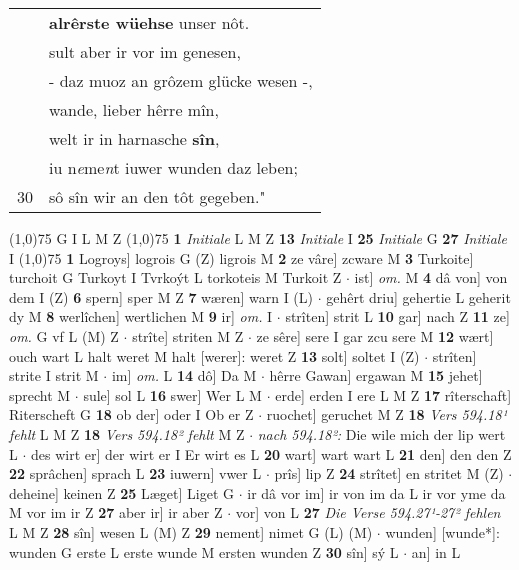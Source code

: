 \documentclass[8pt,a4paper,notitlepage]{article}
\begin{document}
\begin{table}[ht]
\begin{minipage}[t]{0.5\linewidth}
\begin{tabular}{rl}
 & \textbf{alrêrste wüehse} unser nôt.\\ 
 & sult aber ir vor im genesen,\\ 
 & - daz muoz an grôzem glücke wesen -,\\ 
 & wande, lieber hêrre mîn,\\ 
 & welt ir in harnasche \textbf{sîn},\\ 
 & iu n\textit{e}me\textit{n}t iuwer wunden daz leben;\\ 
30 & sô sîn wir an den tôt gegeben."\\ 
\end{tabular}
\scriptsize
\line(1,0){75} \newline
G I L M Z \newline
\line(1,0){75} \newline
\textbf{1} \textit{Initiale} L M Z  \textbf{13} \textit{Initiale} I  \textbf{25} \textit{Initiale} G  \textbf{27} \textit{Initiale} I  \newline
\line(1,0){75} \newline
\textbf{1} Logroys] logrois G (Z) ligrois M \textbf{2} ze vâre] zcware M \textbf{3} Turkoite] turchoit G Turkoyt I Tvrkoýt L torkoteis M Turkoit Z  $\cdot$ ist] \textit{om.} M \textbf{4} dâ von] von dem I (Z) \textbf{6} spern] sper M Z \textbf{7} wæren] warn I (L)  $\cdot$ gehêrt driu] gehertie L geherit dy M \textbf{8} werlîchen] wertlichen M \textbf{9} ir] \textit{om.} I  $\cdot$ strîten] strit L \textbf{10} gar] nach Z \textbf{11} ze] \textit{om.} G vf L (M) Z  $\cdot$ strîte] striten M Z  $\cdot$ ze sêre] sere I gar zcu sere M \textbf{12} wært] ouch wart L halt weret M halt [werer]: weret Z \textbf{13} solt] soltet I (Z)  $\cdot$ strîten] strite I strit M  $\cdot$ im] \textit{om.} L \textbf{14} dô] Da M  $\cdot$ hêrre Gawan] ergawan M \textbf{15} jehet] sprecht M  $\cdot$ sule] sol L \textbf{16} swer] Wer L M  $\cdot$ erde] erden I ere L M Z \textbf{17} rîterschaft] Riterscheft G \textbf{18} ob der] oder I Ob er Z  $\cdot$ ruochet] geruchet M Z \textbf{18} \textit{Vers 594.18¹ fehlt} L M Z  \textbf{18} \textit{Vers 594.18² fehlt} M Z   $\cdot$ \textit{nach 594.18²:} Die wile mich der lip wert L   $\cdot$ des wirt er] der wirt er I Er wirt es L \textbf{20} wart] wart wart L \textbf{21} den] den den Z \textbf{22} sprâchen] sprach L \textbf{23} iuwern] vwer L  $\cdot$ prîs] lip Z \textbf{24} strîtet] en stritet M (Z)  $\cdot$ deheine] keinen Z \textbf{25} Læget] Liget G  $\cdot$ ir dâ vor im] ir von im da L ir vor yme da M vor im ir Z \textbf{27} aber ir] ir aber Z  $\cdot$ vor] von L \textbf{27} \textit{Die Verse 594.27¹-27² fehlen} L M Z  \textbf{28} sîn] wesen L (M) Z \textbf{29} nement] nimet G (L) (M)  $\cdot$ wunden] [wunde*]: wunden G erste L erste wunde M ersten wunden Z \textbf{30} sîn] sý L  $\cdot$ an] in L \newline

\end{minipage}
\end{table}
\end{document}
